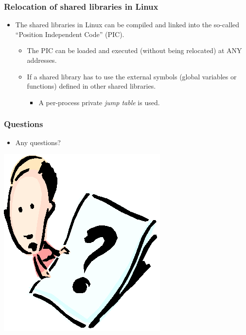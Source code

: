 \documentclass[CJKutf8,xcolor=pdftex,dvipsnames,table]{beamer}
\begin{document}
\begin{CJK*}{UTF8}{song}
  \begin{frame}
    \frametitle{Relocation of shared libraries in Linux} \pause
    \begin{itemize}
    \item{The shared libraries in Linux can be compiled and linked into the
      so-called ``Position Independent Code'' (PIC).} \pause
      \begin{itemize}
      \item{The PIC can be loaded and executed (without being relocated) at ANY addresses.} \pause
      \item{If a shared library has to use the external symbols (global variables or functions) defined in other shared libraries.} \pause
        \begin{itemize}
        \item{A per-process private \emph{jump table} is used.}
        \end{itemize}
      \end{itemize}
    \end{itemize}
  \end{frame}

  \begin{frame}
    \frametitle{Questions}
    \begin{itemize}
    \item{Any questions?}
    \end{itemize}
    \begin{center}
      \includegraphics[scale=.5]{question}
    \end{center}
  \end{frame}

\end{CJK*}
\end{document}
